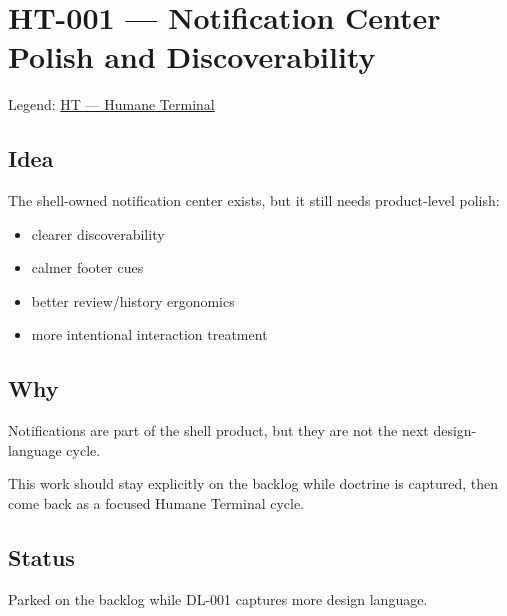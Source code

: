 \chapter{HT-001 --- Notification Center Polish and Discoverability}\label{record-348}

\smallskip

Legend: \href{https://github.com/flyingrobots/bijou/blob/cbd70612140e7a450d764b3c7be1c6af878b99bc/docs/method/graveyard/legends/HT-humane-terminal.md}{HT --- Humane Terminal}

\section{Idea}\label{record-348-idea}

The shell-owned notification center exists, but it still needs product-level polish:

\begin{itemize}
\tightlist
\item
  clearer discoverability
\item
  calmer footer cues
\item
  better review/history ergonomics
\item
  more intentional interaction treatment
\end{itemize}

\section{Why}\label{record-348-why}

Notifications are part of the shell product, but they are not the next design-language cycle.

This work should stay explicitly on the backlog while doctrine is captured, then come back as a focused Humane Terminal cycle.

\section{Status}\label{record-348-status}

Parked on the backlog while DL-001 captures more design language.

